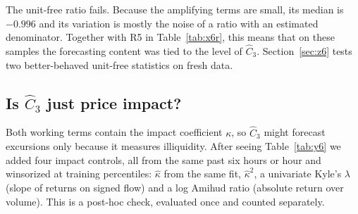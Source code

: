 The unit-free ratio fails. Because the amplifying terms are small, its median is $-0.996$ and its variation is mostly the noise of a ratio with an estimated denominator. Together with R5 in Table~\ref{tab:x6r}, this means that on these samples the forecasting content was tied to the level of $\hat C_3$. Section~\ref{sec:z6} tests two better-behaved unit-free statistics on fresh data.

\subsection{Is $\hat C_3$ just price impact?}\label{sec:y8}
Both working terms contain the impact coefficient $\kappa$, so $\hat C_3$ might forecast excursions only because it measures illiquidity. After seeing Table~\ref{tab:y6} we added four impact controls, all from the same past six hours or hour and winsorized at training percentiles: $\hat\kappa$ from the same fit, $\hat\kappa^2$, a univariate Kyle's $\lambda$ \citep{kyle1985} (slope of returns on signed flow) and a log Amihud ratio \citep{amihud2002} (absolute return over volume). This is a post-hoc check, evaluated once and counted separately.

